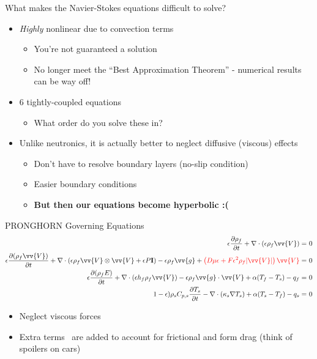\documentclass{beamer}
\begin{document}
\begin{frame}{What makes the Navier-Stokes equations difficult to solve?}

\begin{itemize}
\item \textit{Highly} nonlinear due to convection terms
	\begin{itemize}
		\item You're not guaranteed a solution
		\item No longer meet the ``Best Approximation Theorem'' - numerical results can be way off!
	\end{itemize}
\item 6 tightly-coupled equations
	\begin{itemize}
		\item What order do you solve these in?
	\end{itemize}
\item Unlike neutronics, it is actually better to neglect diffusive (viscous) effects
	\begin{itemize}
		\item Don't have to resolve boundary layers (no-slip condition)
		\item Easier boundary conditions
		\item \textbf{But then our equations become hyperbolic :(}
	\end{itemize}
\end{itemize}

\end{frame}


\begin{frame}{PRONGHORN Governing Equations}
\small
\begin{equation}
\begin{aligned}
\epsilon\frac{\partial\rho_f}{\partial t} + \nabla\cdot(\epsilon\rho_f\vv{V})=&\ 0\\
\epsilon\frac{\partial(\rho_f\vv{V})}{\partial t}+\nabla\cdot(\epsilon\rho_f\vv{V}\otimes\vv{V}+\epsilon P\textbf{I})-\epsilon\rho_f\vv{g}+\color{red}\left(D\mu\epsilon+F\epsilon^2\rho_f|\vv{V}|\right)\vv{V}\color{black}=&\ 0\\
\epsilon\frac{\partial (\rho_f E)}{\partial t}+\nabla\cdot(\epsilon h_f\rho_f\vv{V})-\epsilon\rho_f \vv{g}\cdot\vv{V}+\alpha(T_f-T_s)-q_f=&\ 0\\
1-\epsilon)\rho_sC_{p,s}\frac{\partial T_s}{\partial t}-\nabla\cdot(\kappa_s\nabla T_s)+\alpha(T_s-T_f)-q_s=&\ 0\\
\end{aligned}
\end{equation}
\normalsize
\begin{itemize}
\item Neglect viscous forces
\item \color{red}Extra terms\ \color{black} are added to account for frictional and form drag (think of spoilers on cars)
\end{itemize}

\end{frame}
\end{document}
